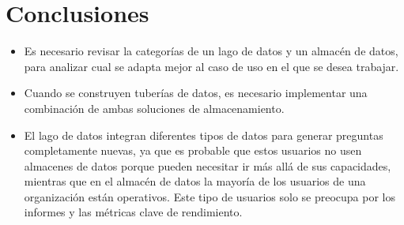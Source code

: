 \documentclass[%
 reprint,
 amsmath,amssymb,
 aps,
]{revtex4-1}
\begin{document}
\section{Conclusiones}

\begin{itemize}
\item Es necesario revisar la categorías de un lago de datos y un almacén de datos, para analizar cual se adapta mejor al caso de uso en el que se desea trabajar.
\item Cuando se construyen tuberías de datos, es necesario implementar una combinación de ambas soluciones de almacenamiento.
\item El lago de datos integran diferentes tipos de datos para generar preguntas completamente nuevas, ya que es probable que estos usuarios no usen almacenes de datos porque pueden necesitar ir más allá de sus capacidades, mientras que en el almacén de datos la mayoría de los usuarios de una organización están operativos. Este tipo de usuarios solo se preocupa por los informes y las métricas clave de rendimiento.

\end{itemize}






\end{document}
